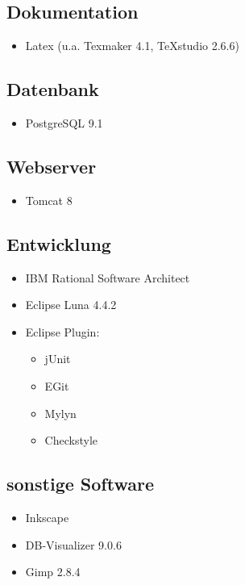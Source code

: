 \documentclass[a4paper]{scrreprt}
\begin{document}
        \subsection{Dokumentation}
            \begin{itemize}
            	\item Latex (u.a. Texmaker 4.1, TeXstudio 2.6.6)
            \end{itemize}
            
        \subsection{Datenbank}
           \begin{itemize}
           	\item PostgreSQL 9.1
           \end{itemize}
           
        \subsection{Webserver}
            \begin{itemize}
            	\item Tomcat 8
            \end{itemize}
            
        \subsection{Entwicklung}
           \begin{itemize}
           	\item IBM Rational Software Architect
           	\item Eclipse Luna 4.4.2
           	\item Eclipse Plugin: \\
	           	\begin{itemize}
	           		\item jUnit
	           		\item EGit
	           		\item Mylyn
	           		\item Checkstyle  
	           	\end{itemize} 
           \end{itemize}
           
        \subsection{sonstige Software}
            \begin{itemize}
            	\item Inkscape
            	\item DB-Visualizer 9.0.6
            	\item Gimp 2.8.4
            \end{itemize}
           
\end{document}
